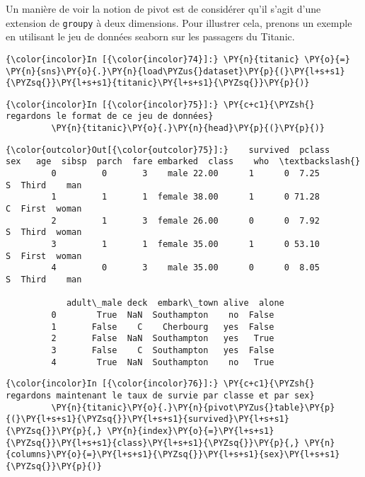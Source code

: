     Un manière de voir la notion de pivot est de considérer qu'il s'agit
d'une extension de \texttt{groupy} à deux dimensions. Pour illustrer
cela, prenons un exemple en utilisant le jeu de données seaborn sur les
passagers du Titanic.

    \begin{Verbatim}[commandchars=\\\{\},frame=single,framerule=0.3mm,rulecolor=\color{cellframecolor}]
{\color{incolor}In [{\color{incolor}74}]:} \PY{n}{titanic} \PY{o}{=} \PY{n}{sns}\PY{o}{.}\PY{n}{load\PYZus{}dataset}\PY{p}{(}\PY{l+s+s1}{\PYZsq{}}\PY{l+s+s1}{titanic}\PY{l+s+s1}{\PYZsq{}}\PY{p}{)}
\end{Verbatim}


    \begin{Verbatim}[commandchars=\\\{\},frame=single,framerule=0.3mm,rulecolor=\color{cellframecolor}]
{\color{incolor}In [{\color{incolor}75}]:} \PY{c+c1}{\PYZsh{} regardons le format de ce jeu de données}
         \PY{n}{titanic}\PY{o}{.}\PY{n}{head}\PY{p}{(}\PY{p}{)}
\end{Verbatim}


\begin{Verbatim}[commandchars=\\\{\},frame=single,framerule=0.3mm,rulecolor=\color{cellframecolor}]
{\color{outcolor}Out[{\color{outcolor}75}]:}    survived  pclass     sex   age  sibsp  parch  fare embarked  class    who  \textbackslash{}
         0         0       3    male 22.00      1      0  7.25        S  Third    man   
         1         1       1  female 38.00      1      0 71.28        C  First  woman   
         2         1       3  female 26.00      0      0  7.92        S  Third  woman   
         3         1       1  female 35.00      1      0 53.10        S  First  woman   
         4         0       3    male 35.00      0      0  8.05        S  Third    man   
         
            adult\_male deck  embark\_town alive  alone  
         0        True  NaN  Southampton    no  False  
         1       False    C    Cherbourg   yes  False  
         2       False  NaN  Southampton   yes   True  
         3       False    C  Southampton   yes  False  
         4        True  NaN  Southampton    no   True
\end{Verbatim}
            
    \begin{Verbatim}[commandchars=\\\{\},frame=single,framerule=0.3mm,rulecolor=\color{cellframecolor}]
{\color{incolor}In [{\color{incolor}76}]:} \PY{c+c1}{\PYZsh{} regardons maintenant le taux de survie par classe et par sex}
         \PY{n}{titanic}\PY{o}{.}\PY{n}{pivot\PYZus{}table}\PY{p}{(}\PY{l+s+s1}{\PYZsq{}}\PY{l+s+s1}{survived}\PY{l+s+s1}{\PYZsq{}}\PY{p}{,} \PY{n}{index}\PY{o}{=}\PY{l+s+s1}{\PYZsq{}}\PY{l+s+s1}{class}\PY{l+s+s1}{\PYZsq{}}\PY{p}{,} \PY{n}{columns}\PY{o}{=}\PY{l+s+s1}{\PYZsq{}}\PY{l+s+s1}{sex}\PY{l+s+s1}{\PYZsq{}}\PY{p}{)}
\end{Verbatim}


